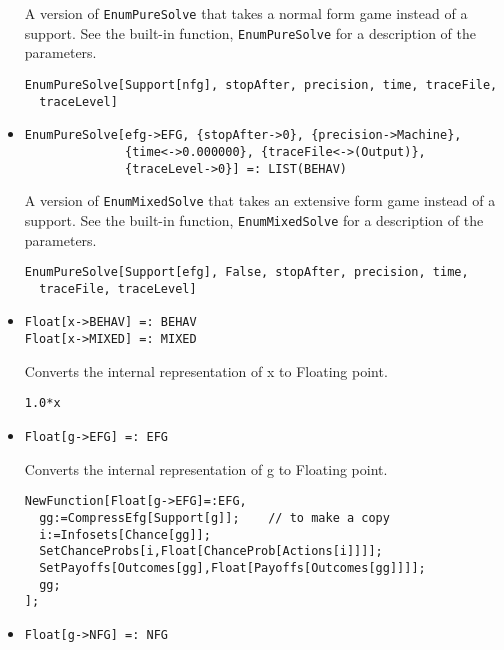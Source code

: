 \begin{itemize}
\bd 
A version of \verb+EnumPureSolve+ that takes a normal form game instead
of a support.  See the built-in function, \verb+EnumPureSolve+ for a
description of the parameters.
\begin{verbatim}
EnumPureSolve[Support[nfg], stopAfter, precision, time, traceFile,
  traceLevel]
\end{verbatim} 
\ed

\item{}
\protect \large \begin{verbatim}
EnumPureSolve[efg->EFG, {stopAfter->0}, {precision->Machine}, 
              {time<->0.000000}, {traceFile<->(Output)}, 
              {traceLevel->0}] =: LIST(BEHAV) 
\end{verbatim}\normalsize

\bd 
A version of \verb+EnumMixedSolve+ that takes an extensive form
game instead of a support.  See the built-in function,
\verb+EnumMixedSolve+ for a description of the parameters.
\begin{verbatim}
EnumPureSolve[Support[efg], False, stopAfter, precision, time, 
  traceFile, traceLevel]
\end{verbatim} 
\ed


\item{}
\protect \large \begin{verbatim}
Float[x->BEHAV] =: BEHAV 
Float[x->MIXED] =: MIXED 
\end{verbatim}\normalsize

\bd 
Converts the internal representation of x to Floating point.  
\begin{verbatim}
1.0*x
\end{verbatim} 
\ed

\item{}
\protect \large \begin{verbatim}
Float[g->EFG] =: EFG 
\end{verbatim}\normalsize

\bd 
Converts the internal representation of g to Floating point.  
\begin{verbatim}
NewFunction[Float[g->EFG]=:EFG,
  gg:=CompressEfg[Support[g]];    // to make a copy
  i:=Infosets[Chance[gg]];
  SetChanceProbs[i,Float[ChanceProb[Actions[i]]]];
  SetPayoffs[Outcomes[gg],Float[Payoffs[Outcomes[gg]]]];
  gg;
];  
\end{verbatim} 
\ed

\item{}
\protect \large \begin{verbatim}
Float[g->NFG] =: NFG 
\end{verbatim}\normalsize


\end{itemize}
